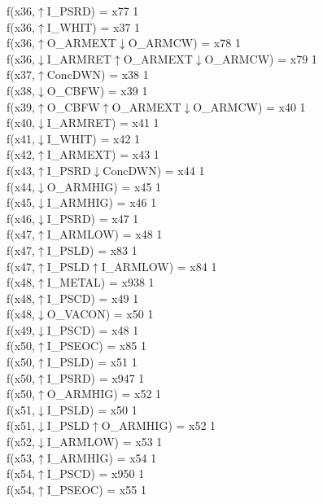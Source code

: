 f(x36,$\uparrow$I\_PSRD) = x77 {1} \\
f(x36,$\uparrow$I\_WHIT) = x37 {1} \\
f(x36,$\uparrow$O\_ARMEXT$\downarrow$O\_ARMCW) = x78 {1} \\
f(x36,$\downarrow$I\_ARMRET$\uparrow$O\_ARMEXT$\downarrow$O\_ARMCW) = x79 {1} \\
f(x37,$\uparrow$ConcDWN) = x38 {1} \\
f(x38,$\downarrow$O\_CBFW) = x39 {1} \\
f(x39,$\uparrow$O\_CBFW$\uparrow$O\_ARMEXT$\downarrow$O\_ARMCW) = x40 {1} \\
f(x40,$\downarrow$I\_ARMRET) = x41 {1} \\
f(x41,$\downarrow$I\_WHIT) = x42 {1} \\
f(x42,$\uparrow$I\_ARMEXT) = x43 {1} \\
f(x43,$\uparrow$I\_PSRD$\downarrow$ConcDWN) = x44 {1} \\
f(x44,$\downarrow$O\_ARMHIG) = x45 {1} \\
f(x45,$\downarrow$I\_ARMHIG) = x46 {1} \\
f(x46,$\downarrow$I\_PSRD) = x47 {1} \\
f(x47,$\uparrow$I\_ARMLOW) = x48 {1} \\
f(x47,$\uparrow$I\_PSLD) = x83 {1} \\
f(x47,$\uparrow$I\_PSLD$\uparrow$I\_ARMLOW) = x84 {1} \\
f(x48,$\uparrow$I\_METAL) = x938 {1} \\
f(x48,$\uparrow$I\_PSCD) = x49 {1} \\
f(x48,$\downarrow$O\_VACON) = x50 {1} \\
f(x49,$\downarrow$I\_PSCD) = x48 {1} \\
f(x50,$\uparrow$I\_PSEOC) = x85 {1} \\
f(x50,$\uparrow$I\_PSLD) = x51 {1} \\
f(x50,$\uparrow$I\_PSRD) = x947 {1} \\
f(x50,$\uparrow$O\_ARMHIG) = x52 {1} \\
f(x51,$\downarrow$I\_PSLD) = x50 {1} \\
f(x51,$\downarrow$I\_PSLD$\uparrow$O\_ARMHIG) = x52 {1} \\
f(x52,$\downarrow$I\_ARMLOW) = x53 {1} \\
f(x53,$\uparrow$I\_ARMHIG) = x54 {1} \\
f(x54,$\uparrow$I\_PSCD) = x950 {1} \\
f(x54,$\uparrow$I\_PSEOC) = x55 {1} \\
